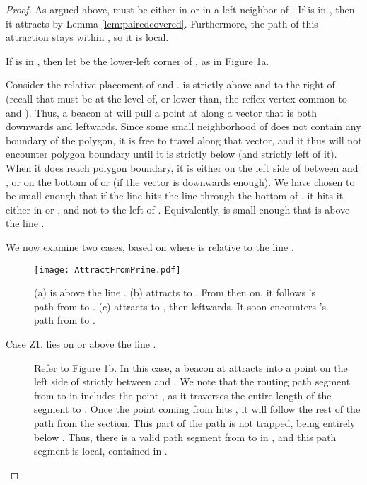 \documentclass{article}
\begin{document}
\begin{proof}
		As argued above,  must be either in  or in a left neighbor  of .
		If  is in , then it attracts  by Lemma \ref{lem:pairedcovered}.
		Furthermore, the path of this attraction stays within , so it is
		local.
		
		If  is in , then 
		let  be the lower-left corner of , as in Figure
		\ref{fig:attractfromprime}a.
		
		Consider the relative placement of  and .
		 is strictly above and to the right of 
		(recall that  must be at the level of, or lower than,
		the reflex vertex  common to  and ).
		Thus, a beacon at  will pull a point at  along a vector
		that is both downwards and leftwards.
		Since some small neighborhood of  does not contain any boundary of the
		polygon,
		it is free to travel along that vector, and it thus will not encounter
		polygon boundary until it is strictly below  (and strictly left of it).
		When it does reach polygon boundary, it is either on the left side of 
		between  and , or on the bottom of  or  (if the vector is
		downwards enough).  We have chosen  to be small enough that if
		the line  hits the line through the bottom of , it hits it 
		either in  or , and not to the left of .
		Equivalently,  is small enough that  is above the line
		.
		
		We now examine two cases, based on where  is relative to the line .
		
		\begin{figure}[htbp] 
			\begin{center}
				\texttt{[image: AttractFromPrime.pdf]} 
			\end{center}
			\caption{
				(a)  is above the line . 
				(b)  attracts  to .  From then on, it follows 's
					path from  to .
				(c)  attracts  to , then leftwards.  It soon encounters 's
					path from  to .
			}
			\label{fig:attractfromprime}
		\end{figure}
		
		\begin{description}
		\item[Case Z1.  lies on or above the line .]
			Refer to Figure \ref{fig:attractfromprime}b. 
			In this case, a beacon at  attracts  into a point  on the left side
			of  strictly between  and .  
			We note that the routing path segment from  to  in
			 includes the point , as it traverses the entire length of the
			segment  to .
			Once the point coming from  hits , it
			will follow the rest of the path from the  section.
			This part of the path is not trapped, being entirely below .
			Thus, there is a valid path segment from  to  in ,
			and this path segment is local, contained in .
		

\end{description}
\end{proof}
\end{document}
